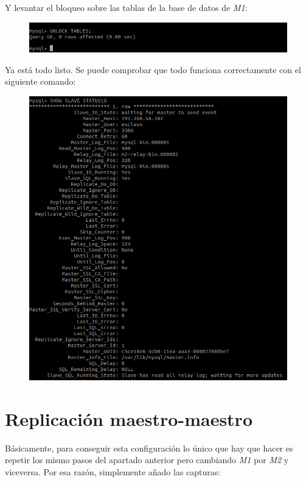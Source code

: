 \documentclass[12pt]{article}
\begin{document}
Y levantar el bloqueo sobre las tablas de la base de datos de \textit{M1}:
\begin{figure}[H]
\center
\includegraphics[scale=0.35]{21.png}
\end{figure}

Ya está todo listo. Se puede comprobar que todo funciona correctamente con el siguiente comando:

\begin{figure}[H]
\center
\includegraphics[scale=0.35]{22.png}
\end{figure}

\section{Replicación maestro-maestro}

Básicamente, para conseguir esta configuración lo único que hay que hacer es repetir los mismo pasos del apartado anterior pero cambiando \textit{M1} por \textit{M2} y viceversa. Por esa razón, simplemente añado las capturas:
\end{document}
